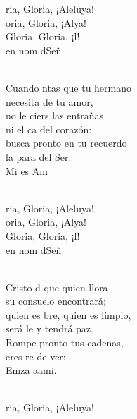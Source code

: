 \documentclass[12pt]{article}
\begin{document}
\begin{multicols*}{2}
\begin{cancion}%
	\begin{chorus}%
	ria, Gloria, ¡Aleluya!\\
	oria, Gloria, ¡Alya!\\
	Gloria, Gloria, ¡l!\\
	en nom dSeñ \\
	\end{chorus}%
	\jump\\
	Cuando ntas que tu hermano\\
necesita de tu amor,\\
	no le ciers las entrañas\\
	ni el ca del corazón:\\
busca pronto en tu recuerdo\\
	la para del Ser:\\
	Mi  es  Am\\\jump\\
	\begin{chorus}%
	ria, Gloria, ¡Aleluya!\\
	oria, Gloria, ¡Alya!\\
	Gloria, Gloria, ¡l!\\
	en nom dSeñ \\
	\end{chorus}%
	\jump\\
	Cristo d que quien llora\\
su consuelo encontrará;\\
	quien es bre, quien es limpio,\\
	será le y tendrá paz.\\
Rompe pronto tus cadenas,\\
	eres re de ver:\\
	Emza aami.\\\jump\\
	\begin{chorus}%
	ria, Gloria, ¡Aleluya!\\

\end{chorus}
\end{cancion}
\end{multicols*}
\end{document}
